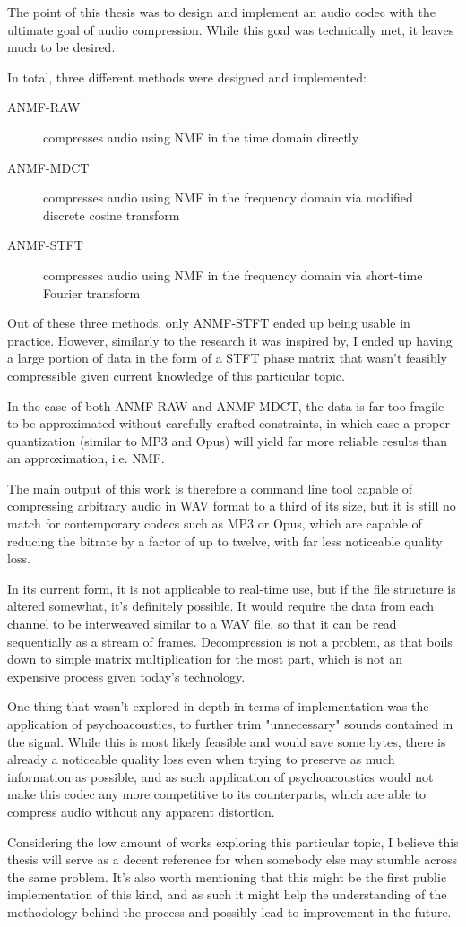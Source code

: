 The point of this thesis was to design and implement an audio codec with the ultimate goal of audio compression. While this goal was technically met, it leaves much to be desired.

In total, three different methods were designed and implemented:

\begin{description}
	\item[ANMF-RAW] compresses audio using NMF in the time domain directly
	\item[ANMF-MDCT] compresses audio using NMF in the frequency domain via modified discrete cosine transform
	\item[ANMF-STFT] compresses audio using NMF in the frequency domain via short-time Fourier transform
\end{description}

Out of these three methods, only ANMF-STFT ended up being usable in practice. However, similarly to the research it was inspired by, I ended up having a large portion of data in the form of a STFT phase matrix that wasn't feasibly compressible given current knowledge of this particular topic.

In the case of both ANMF-RAW and ANMF-MDCT, the data is far too fragile to be approximated without carefully crafted constraints, in which case a proper quantization (similar to MP3 and Opus) will yield far more reliable results than an approximation, i.e. NMF.

The main output of this work is therefore a command line tool capable of compressing arbitrary audio in WAV format to a third of its size, but it is still no match for contemporary codecs such as MP3 or Opus, which are capable of reducing the bitrate by a factor of up to twelve, with far less noticeable quality loss.

In its current form, it is not applicable to real-time use, but if the file structure is altered somewhat, it's definitely possible. It would require the data from each channel to be interweaved similar to a WAV file, so that it can be read sequentially as a stream of frames. Decompression is not a problem, as that boils down to simple matrix multiplication for the most part, which is not an expensive process given today's technology.

One thing that wasn't explored in-depth in terms of implementation was the application of psychoacoustics, to further trim "unnecessary" sounds contained in the signal. While this is most likely feasible and would save some bytes, there is already a noticeable quality loss even when trying to preserve as much information as possible, and as such application of psychoacoustics would not make this codec any more competitive to its counterparts, which are able to compress audio without any apparent distortion.

Considering the low amount of works exploring this particular topic, I believe this thesis will serve as a decent reference for when somebody else may stumble across the same problem. It's also worth mentioning that this might be the first public implementation of this kind, and as such it might help the understanding of the methodology behind the process and possibly lead to improvement in the future.
